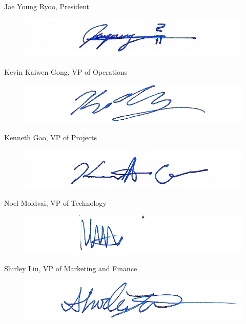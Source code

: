 \documentclass{article}
\begin{document}
Jae Young Ryoo, President
\begin{figure} [H]
\includegraphics[scale = .4]{signatures_jay.png}
\end{figure}
Kevin Kaiwen Gong, VP of Operations
\begin{figure} [H]
\includegraphics[scale = .4]{signatures_kevin.png}
\end{figure}
Kenneth Gao, VP of Projects
\begin{figure} [H]
\includegraphics[scale = .4]{signatures_kenneth.png}
\end{figure}
Noel Moldvai, VP of Technology
\begin{figure} [H]
\includegraphics[scale = .4]{signatures_noel.png}
\end{figure}
Shirley Liu, VP of Marketing and Finance
\begin{figure} [H]
\includegraphics[scale = .4]{signatures_shirley.png}
\end{figure}
\end{document}
